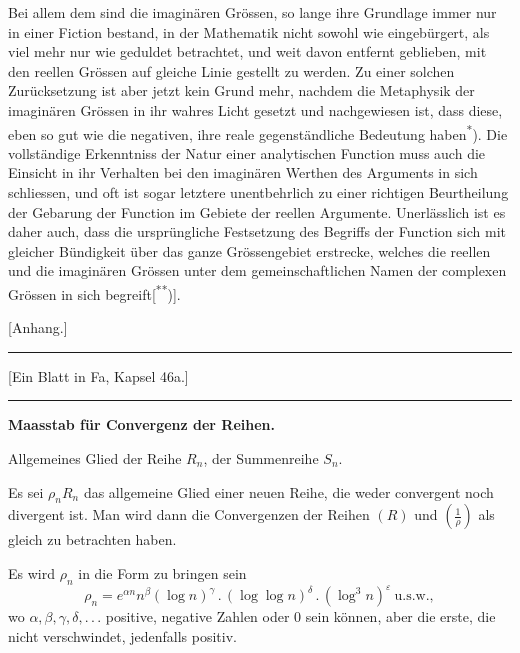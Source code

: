 Bei allem dem sind die imaginären Grössen, so lange ihre Grundlage immer nur in einer Fiction bestand, in der Mathematik nicht sowohl wie eingebürgert, als viel mehr nur wie geduldet betrachtet, und weit davon entfernt geblieben, mit den reellen Grössen auf gleiche Linie gestellt zu werden.
\clearpage{}
\noindent Zu einer solchen Zurücksetzung ist aber jetzt kein Grund mehr, nachdem die Metaphysik der imaginären Grössen in ihr wahres Licht gesetzt und nachgewiesen ist, dass diese, eben so gut wie die negativen, ihre reale gegenständliche Bedeutung haben\textsuperscript{*}). Die vollständige Erkenntniss der Natur einer analytischen Function muss auch die Einsicht in ihr Verhalten bei den imaginären Werthen des Arguments in sich schliessen, und oft ist sogar letztere unentbehrlich zu einer richtigen Beurtheilung der Gebarung der Function im Gebiete der reellen Argumente. Unerlässlich ist es daher auch, dass die ursprüngliche Festsetzung des Begriffs der Function sich mit gleicher Bündigkeit über das ganze Grössengebiet erstrecke, welches die reellen und die imaginären Grössen unter dem gemeinschaftlichen Namen der complexen Grössen in sich begreift[\textsuperscript{**})].
\ClosingRule
\begin{center}[Anhang.]\end{center}
\begin{center}\begin{minipage}{.45\linewidth}
\hrule\smallskip\centering\small [Ein Blatt in Fa, Kapsel {\scriptsize 46}a.]\par\smallskip\hrule
\end{minipage}\end{center}
\begin{center}\bfseries Maasstab für Convergenz der Reihen.\end{center}
\begin{center}Allgemeines Glied der Reihe \(R_n\), der Summenreihe \(S_n\).\end{center}
\noindent\hspace*{\parindent}Es sei \(\rho_nR_n\) das allgemeine Glied einer neuen Reihe, die weder convergent noch divergent ist. Man wird dann die Convergenzen der Reihen \((R)\) und \(\left(\frac1\rho\right)\) als gleich zu betrachten haben.

Es wird \(\rho_n\) in die Form zu bringen sein
\[
\rho_n=e^{\alpha n}n^\beta(\log n)^\gamma\,{.}\,(\log\log n)^\delta\,{.}\,(\log^3 n)^\varepsilon\ \text{u.s.w.},
\]
\noindent wo \(\alpha,\beta,\gamma,\delta,{.}\,{.}\,{.}\) positive, negative Zahlen oder 0 sein können, aber die erste, die nicht verschwindet, jedenfalls positiv.

